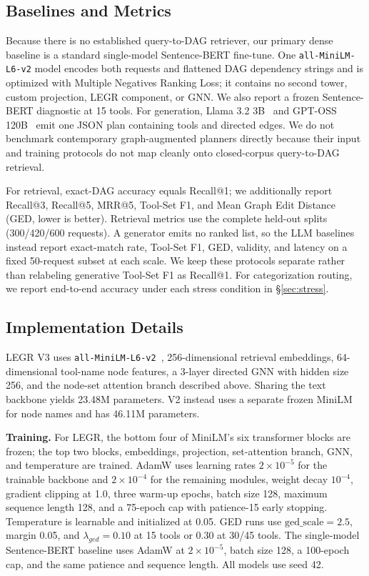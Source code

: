 \documentclass{article}
\begin{document}
\subsection{Baselines and Metrics}
Because there is no established query-to-DAG retriever, our primary dense baseline is a standard single-model Sentence-BERT fine-tune. One \texttt{all-MiniLM-L6-v2} model encodes both requests and flattened DAG dependency strings and is optimized with Multiple Negatives Ranking Loss; it contains no second tower, custom projection, LEGR component, or GNN. We also report a frozen Sentence-BERT diagnostic at 15 tools. For generation, Llama 3.2 3B~\cite{meta2024llama32} and GPT-OSS 120B~\cite{openai2025gptoss} emit one JSON plan containing tools and directed edges. We do not benchmark contemporary graph-augmented planners directly because their input and training protocols do not map cleanly onto closed-corpus query-to-DAG retrieval.

For retrieval, exact-DAG accuracy equals Recall@1; we additionally report Recall@3, Recall@5, MRR@5, Tool-Set F1, and Mean Graph Edit Distance (GED, lower is better). Retrieval metrics use the complete held-out splits (300/420/600 requests). A generator emits no ranked list, so the LLM baselines instead report exact-match rate, Tool-Set F1, GED, validity, and latency on a fixed 50-request subset at each scale. We keep these protocols separate rather than relabeling generative Tool-Set F1 as Recall@1. For categorization routing, we report end-to-end accuracy under each stress condition in \S\ref{sec:stress}.

\subsection{Implementation Details}
\label{sec:impl}
LEGR V3 uses \texttt{all-MiniLM-L6-v2}~\cite{wang2020minilm,reimers-gurevych-2019-sentence}, 256-dimensional retrieval embeddings, 64-dimensional tool-name node features, a 3-layer directed GNN with hidden size 256, and the node-set attention branch described above. Sharing the text backbone yields 23.48M parameters. V2 instead uses a separate frozen MiniLM for node names and has 46.11M parameters.

\textbf{Training.} For LEGR, the bottom four of MiniLM's six transformer blocks are frozen; the top two blocks, embeddings, projection, set-attention branch, GNN, and temperature are trained. AdamW uses learning rates $2\times10^{-5}$ for the trainable backbone and $2\times10^{-4}$ for the remaining modules, weight decay $10^{-4}$, gradient clipping at 1.0, three warm-up epochs, batch size 128, maximum sequence length 128, and a 75-epoch cap with patience-15 early stopping. Temperature is learnable and initialized at 0.05. GED runs use $\text{ged\_scale}=2.5$, margin 0.05, and $\lambda_{ged}=0.10$ at 15 tools or 0.30 at 30/45 tools. The single-model Sentence-BERT baseline uses AdamW at $2\times10^{-5}$, batch size 128, a 100-epoch cap, and the same patience and sequence length. All models use seed 42.
\end{document}
